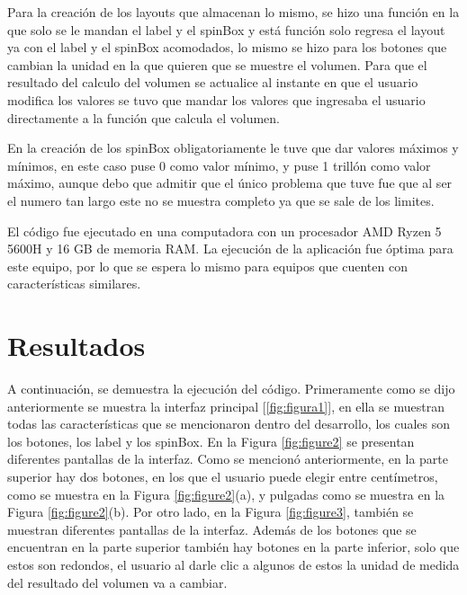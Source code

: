 \documentclass[conference]{IEEEtran}
\begin{document}

Para la creación de los layouts que almacenan lo mismo, se hizo una función en la que solo se le mandan el label y el spinBox y está función solo regresa el layout ya con el label y el spinBox acomodados, lo mismo se hizo para los botones que cambian la unidad en la que quieren que se muestre el volumen.
Para que el resultado del calculo del volumen se actualice al instante en que el usuario modifica los valores se tuvo que mandar los valores que ingresaba el usuario directamente a la función que calcula el volumen.

En la creación de los spinBox obligatoriamente le tuve que dar valores máximos y mínimos, en este caso puse 0 como valor mínimo, y puse 1 trillón como valor máximo, aunque debo que admitir que el único problema que tuve fue que al ser el numero tan largo este no se muestra completo ya que se sale de los limites.

El código fue ejecutado en una computadora con un procesador AMD Ryzen 5 5600H y 16 GB de memoria RAM. La ejecución de la aplicación fue óptima para este equipo, por lo que se espera lo mismo para equipos que cuenten con características similares.


\section{Resultados}

A continuación, se demuestra la ejecución del código. Primeramente como se dijo anteriormente se muestra la interfaz principal [\ref{fig:figura1}], en ella se muestran todas las características que se mencionaron dentro del desarrollo, los cuales son los botones, los label y los spinBox. En la Figura \ref{fig:figure2} se presentan diferentes pantallas de la interfaz. Como se mencionó anteriormente, en la parte superior hay dos botones, en los que el usuario puede elegir entre centímetros, como se muestra en la Figura \ref{fig:figure2}(a), y pulgadas como se muestra en la Figura \ref{fig:figure2}(b). 
Por otro lado, en la Figura \ref{fig:figure3}, también se muestran diferentes pantallas de la interfaz. Además de los botones que se encuentran en la parte superior también hay botones en la parte inferior, solo que estos son redondos, el usuario al darle clic a algunos de estos la unidad de medida del resultado del volumen va a cambiar.

\end{document}
